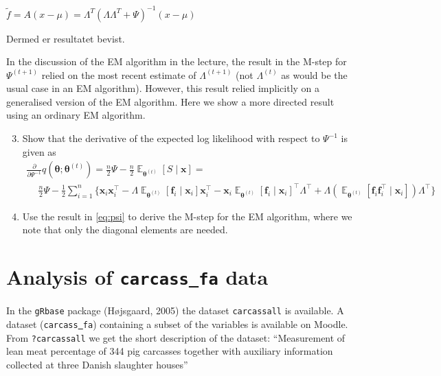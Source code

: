 \documentclass{article}
\DeclareMathOperator{\E}{\mathbb{E}}
\newcommand{\bx}{\ensuremath{\bm{x}}}
\newcommand{\bmf}{\ensuremath{\bm{f}}}
\newcommand{\Lm}{\ensuremath{\Lambda}}
\newcommand{\diff}[1]{\ensuremath{{\frac{\partial}{\partial#1}}}}
\newcommand{\bt}{\ensuremath{{\bm{\theta}}}}
\newcommand{\bti}[1]{\ensuremath{{\bm{\theta}^{(#1)}}}}
\begin{document}
	\begin{center}
		$\tilde{f}=A(x-\mu)=\Lambda^T(\Lambda\Lambda^T+\Psi)^{-1}(x-\mu)$
	\end{center}
	
	Dermed er resultatet bevist.


In the discussion of the EM algorithm in the lecture, the result in
the M-step for $\Psi^{(t+1)}$ relied on the most recent estimate of
$\Lm^{(t+1)}$ (not $\Lm^{(t)}$ as would be the usual case in an EM
algorithm). However, this result relied implicitly on a generalised
version of the EM algorithm. Here we show a more directed result using
an ordinary EM algorithm.

\begin{enumerate}
  \setcounter{enumi}{2}
\item Show that the derivative of the expected log likelihood with
  respect to $\Psi^{-1}$ is given as
\begin{multline}
  \diff{\Psi^{-1}}q(\bt; \bti{t}) = \frac{n}{2}\Psi -
  \frac{n}{2}\E_{\bti{t}}[S\mid \bx] = \\
 ~\quad\frac{n}{2}\Psi -\frac{1}{2}\sum_{i=1}^n
 \{\bx_i\bx_i^\top - \Lm\E_{\bti{t}}[\bmf_i\mid\bx_i]\bx_i^\top -
  \bx_i\E_{\bti{t}}[\bmf_i\mid\bx_i]^\top\Lm^\top +
  \Lm(\E_{\bti{t}}[\bmf_i\bmf_i^\top\mid\bx_i])\Lm^\top\} \label{eq:psi}
\end{multline}
\item Use the result in \eqref{eq:psi} to derive the M-step for the EM
  algorithm, where we note that only the diagonal elements are needed.
\end{enumerate}

\section{Analysis of \texttt{carcass\underline{~}fa} data}

In the \texttt{gRbase} package (H{\o}jsgaard, 2005) the dataset
\texttt{carcassall} is available. A dataset
(\texttt{carcass\underline{~}fa}) containing a subset of the variables
is available on Moodle. From \texttt{?carcassall} we get the short
description of the dataset: ``Measurement of lean meat percentage of
344 pig carcasses together with auxiliary information collected at
three Danish slaughter houses''
\end{document}

